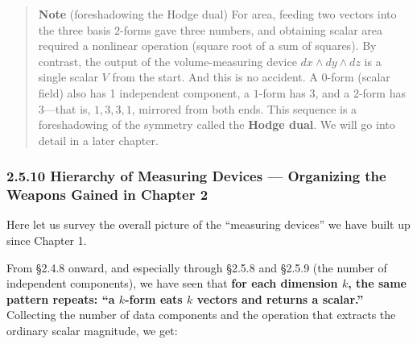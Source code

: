 \begin{quote}
\textbf{Note} (foreshadowing the Hodge dual) For area, feeding two
vectors into the three basis \(2\)-forms gave three numbers, and
obtaining scalar area required a nonlinear operation (square root of a
sum of squares). By contrast, the output of the volume-measuring device
\(dx \wedge dy \wedge dz\) is a single scalar \(V\) from the start. And
this is no accident. A \(0\)-form (scalar field) also has 1 independent
component, a \(1\)-form has 3, and a \(2\)-form has 3---that is,
\(1, 3, 3, 1\), mirrored from both ends. This sequence is a
foreshadowing of the symmetry called the \textbf{Hodge dual}. We will go
into detail in a later chapter.
\end{quote}

\hypertarget{hierarchy-of-measuring-devices-organizing-the-weapons-gained-in-chapter-2}{%
\subsubsection{2.5.10 Hierarchy of Measuring Devices --- Organizing the
Weapons Gained in Chapter
2}\label{hierarchy-of-measuring-devices-organizing-the-weapons-gained-in-chapter-2}}

Here let us survey the overall picture of the ``measuring devices'' we
have built up since Chapter 1.

From §2.4.8 onward, and especially through §2.5.8 and §2.5.9 (the number
of independent components), we have seen that
\textbf{for each dimension $k$, the same pattern repeats: “a $k$-form eats $k$ vectors and returns a scalar.”}
Collecting the number of data components and the operation that extracts
the ordinary scalar magnitude, we get:

